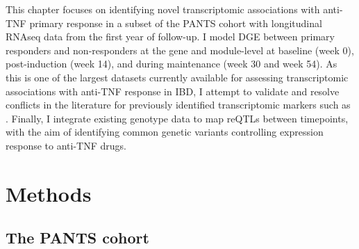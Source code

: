 This chapter focuses on identifying novel transcriptomic associations with anti-\gls{TNF} primary response 
in a subset of the \gls{PANTS} cohort with longitudinal \gls{RNAseq} data from the first year of follow-up.
I model \gls{DGE} between primary responders and non-responders at the gene and module-level 
at baseline (week 0), post-induction (week 14), and during maintenance (week 30 and week 54).
As this is one of the largest datasets currently available for assessing transcriptomic associations with anti-\gls{TNF} response in \gls{IBD},
I attempt to validate and resolve conflicts in the literature for previously identified transcriptomic markers such as .
Finally, I integrate existing genotype data to map \glspl{reQTL} between timepoints,
with the aim of identifying common genetic variants controlling expression response to anti-\gls{TNF} drugs.


\section{Methods}

\subsection{The PANTS cohort}

